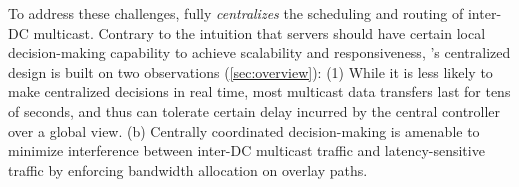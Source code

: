 %

To address these challenges, \name fully {\em centralizes}
the scheduling and routing of inter-DC multicast.
Contrary to the intuition that servers should have certain
local decision-making capability to achieve scalability and
responsiveness, \name's centralized design
is built on two observations (\Section\ref{sec:overview}):
(1) While it is less likely to make
centralized decisions in real time, most multicast data transfers
last for tens of seconds, and thus can tolerate certain delay incurred by
the central controller over a global view.
(b) Centrally coordinated decision-making is amenable
to minimize interference between inter-DC multicast
traffic and latency-sensitive traffic by enforcing
bandwidth allocation on overlay paths.

